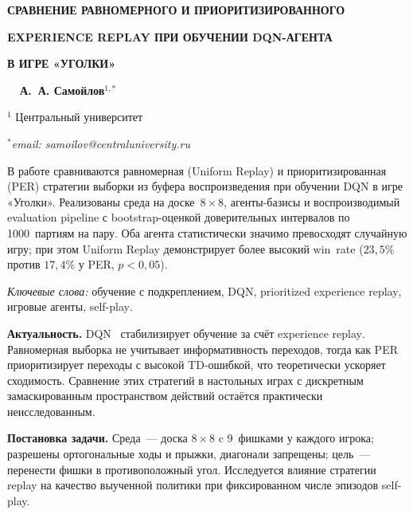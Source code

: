 \documentclass[oneside, a5paper,10pt]{article}
\begin{document}
\pagestyle{fancy}
\fancyhead{}\fancyfoot{}
\cfoot{\thepage}

\centerline{\bf СРАВНЕНИЕ РАВНОМЕРНОГО И ПРИОРИТИЗИРОВАННОГО} %
\centerline{\bf EXPERIENCE REPLAY ПРИ ОБУЧЕНИИ DQN-АГЕНТА}
\centerline{\bf В ИГРЕ «УГОЛКИ»}

\smallskip %
\centerline{\bf}
\centerline{\bf \ \ А.~А. Самойлов$^{1,*}$}
\smallskip
\centerline{$^{1}$ Центральный университет}
\centerline{$^{*}$\it email: samoilov@centraluniversity.ru}
\bigskip %

В работе сравниваются равномерная (Uniform Replay) и приоритизированная (PER) стратегии выборки из буфера воспроизведения при обучении DQN в игре «Уголки». Реализованы среда на доске~$8\times8$, агенты-базисы и воспроизводимый evaluation pipeline с bootstrap-оценкой доверительных интервалов по 1000~партиям на пару. Оба агента статистически значимо превосходят случайную игру; при этом Uniform Replay демонстрирует более высокий win~rate ($23{,}5\%$ против $17{,}4\%$ у PER, $p<0{,}05$).
\medskip

\textit{Ключевые слова:} обучение с подкреплением, DQN, \foreignlanguage{english}{prioritized experience replay}, игровые агенты, \foreignlanguage{english}{self-play}.

\medskip %

\textbf{Актуальность.} DQN~\cite{Mnih15} стабилизирует обучение за счёт \foreignlanguage{english}{experience replay}. Равномерная выборка не учитывает информативность переходов, тогда как PER~\cite{Schaul16} приоритизирует переходы с высокой TD-ошибкой, что теоретически ускоряет сходимость. Сравнение этих стратегий в настольных играх с дискретным замаскированным пространством действий остаётся практически неисследованным.

\textbf{Постановка задачи.} Среда~--- доска $8\times8$ c 9~фишками у каждого игрока; разрешены ортогональные ходы и прыжки, диагонали запрещены; цель~--- перенести фишки в противоположный угол. Исследуется влияние стратегии replay на качество выученной политики при фиксированном числе эпизодов self-play.
\end{document}
